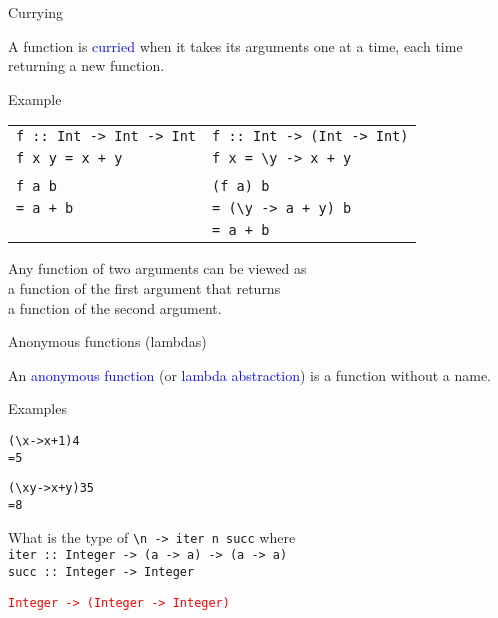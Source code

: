 \documentclass{beamer}
\def\code#1{\texttt{\frenchspacing#1}}
\begin{document}
\begin{frame}{Currying}

A function is \textcolor{blue}{curried} when it takes its arguments one at a time, each time returning a new function.

\pause

\begin{exampleblock}{Example}
\vspace{0.25cm}
\begin{tabular}{ll}
    \code{f :: Int -> Int -> Int} & \code{f :: Int -> (Int -> Int)} \\
    \code{f x y = x + y} & \code{f x = \textbackslash y -> x + y}\pause \\
    & \\
    \code{f a b} & \code{(f a) b}\pause \\
    \code{= a + b}\pause & \code{= (\textbackslash y -> a + y) b}\pause \\
    & \code{= a + b}
\end{tabular}
\end{exampleblock}

\pause

\begin{block}{\centering Any function of two arguments can be viewed as \\ a function of the first argument that returns \\ a function of the second argument.}
\end{block}

\end{frame}

\begin{frame}[fragile]{Anonymous functions (lambdas)}

An \textcolor{blue}{anonymous function} (or \textcolor{blue}{lambda abstraction}) is a function without a name.

\pause

\begin{exampleblock}{Examples}
\begin{alltt}
({\textbackslash}x -> x + 1) 4\pause
= 5

({\textbackslash}x y -> x + y) 3 5\pause
= 8
\end{alltt}
\end{exampleblock}

\pause

What is the type of \code{\textbackslash n -> iter n succ} where \\
\code{iter :: Integer -> (a -> a) -> (a -> a)} \\
\code{succ :: Integer -> Integer}

\pause

\vspace{0.25cm}
\textcolor{red}{\code{Integer -> (Integer -> Integer)}}

\end{frame}
\end{document}
